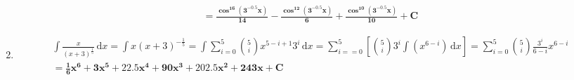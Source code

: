 \documentclass[]{article}
\newcommand\dx    {\,\mathrm{d}x}
\newcommand\cl [1]    {\left ( #1 \right )}
\newcommand\csb[1]    {\left [ #1 \right ]}
\begin{document}
\begin{enumerate}
\begin{multline*}
			= \bm{\frac{\cos^{16}\cl{3^{-0.5}x}}{14} - \frac{\cos^{12}\cl{3^{-0.5}x}}{6} + \frac{\cos^{10}\cl{3^{-0.5}x}}{10} + C}
		\end{multline*}
		\item 
		\begin{multline*}
			\int \frac{x}{(x + 3)^{\frac{1}{5}}}\dx = \int x(x + 3)^{-\frac{1}{5}} = \int \sum_{i = 0}^{5}\binom{5}{i}x^{5 - i + 1}3^{i}\dx = \sum_{i = = 0}^{5} \csb{\binom{5}{i}3^{i} \int \cl{x^{6 - i}}\dx} = \sum_{i = 0}^{5}\binom{5}{i}\frac{3^{i}}{6 - i} x^{6 - i} \\ 
			= \bm{\tfrac{1}{6}x^6 + 3x^5 + 22.5x^4 + 90x^3 + 202.5x^2 + 243x + C}
		\end{multline*}
	\end{enumerate}
	\section{}
\end{document}

